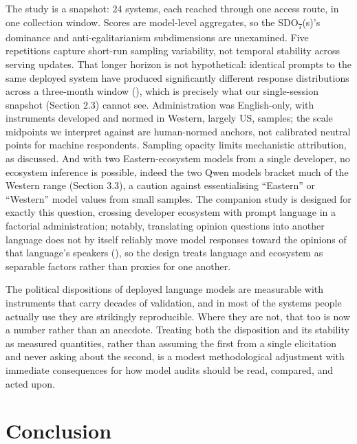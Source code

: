 \documentclass[
]{article}
\begin{document}
The study is a snapshot: 24 systems, each reached through one access
route, in one collection window. Scores are model-level aggregates, so
the SDO\textsubscript{7}(s)'s dominance and anti-egalitarianism
subdimensions are unexamined. Five repetitions capture short-run
sampling variability, not temporal stability across serving updates.
That longer horizon is not hypothetical: identical prompts to the same
deployed system have produced significantly different response
distributions across a three-month window
(), which is precisely
what our single-session snapshot (Section 2.3) cannot see.
Administration was English-only, with instruments developed and normed
in Western, largely US, samples; the scale midpoints we interpret
against are human-normed anchors, not calibrated neutral points for
machine respondents. Sampling opacity limits mechanistic attribution, as
discussed. And with two Eastern-ecosystem models from a single
developer, no ecosystem inference is possible, indeed the two Qwen
models bracket much of the Western range (Section 3.3), a caution
against essentialising ``Eastern'' or ``Western'' model values from
small samples. The companion study is designed for exactly this
question, crossing developer ecosystem with prompt language in a
factorial administration; notably, translating opinion questions into
another language does not by itself reliably move model responses toward
the opinions of that language's speakers
(), so the design treats
language and ecosystem as separable factors rather than proxies for one
another.

The political dispositions of deployed language models are measurable
with instruments that carry decades of validation, and in most of the
systems people actually use they are strikingly reproducible. Where they
are not, that too is now a number rather than an anecdote. Treating both
the disposition and its stability as measured quantities, rather than
assuming the first from a single elicitation and never asking about the
second, is a modest methodological adjustment with immediate
consequences for how model audits should be read, compared, and acted
upon.

\section{Conclusion}\label{conclusion}
\end{document}
